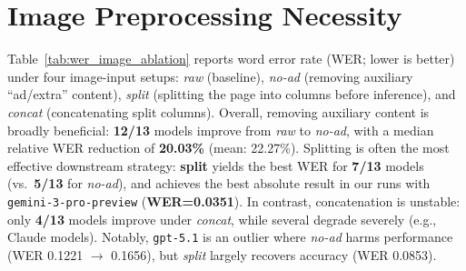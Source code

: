 \section{Image Preprocessing Necessity}
\label{sec:image-preprocessing}
Table~\ref{tab:wer_image_ablation} reports word error rate (WER; lower is better) under four image-input setups: \emph{raw} (baseline), \emph{no-ad} (removing auxiliary ``ad/extra'' content), \emph{split} (splitting the page into columns before inference), and \emph{concat} (concatenating split columns).
Overall, removing auxiliary content is broadly beneficial: \textbf{12/13} models improve from \emph{raw} to \emph{no-ad}, with a median relative WER reduction of \textbf{20.03\%} (mean: 22.27\%).
Splitting is often the most effective downstream strategy: \textbf{split} yields the best WER for \textbf{7/13} models (vs.\ \textbf{5/13} for \emph{no-ad}), and achieves the best absolute result in our runs with \texttt{gemini-3-pro-preview} (\textbf{WER=0.0351}).
In contrast, concatenation is unstable: only \textbf{4/13} models improve under \emph{concat}, while several degrade severely (e.g., Claude models).
Notably, \texttt{gpt-5.1} is an outlier where \emph{no-ad} harms performance (WER 0.1221 $\rightarrow$ 0.1656), but \emph{split} largely recovers accuracy (WER 0.0853).



